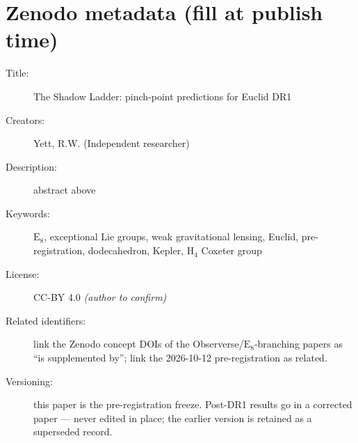 \documentclass{alienfolio}
\begin{document}
\section*{Zenodo metadata (fill at publish time)}

\begin{description}
\item[Title:] The Shadow Ladder: pinch-point predictions for Euclid DR1
\item[Creators:] Yett, R.W. (Independent researcher)
\item[Description:] abstract above
\item[Keywords:] $\mathrm{E}_8$, exceptional Lie groups, weak
gravitational lensing, Euclid, pre-registration, dodecahedron, Kepler,
$\mathrm{H}_4$ Coxeter group
\item[License:] CC-BY 4.0 \emph{(author to confirm)}
\item[Related identifiers:] link the Zenodo concept DOIs of the
Observerse/$\mathrm{E}_8$-branching papers as ``is supplemented by'';
link the 2026-10-12 pre-registration as related.
\item[Versioning:] this paper is the pre-registration freeze.
Post-DR1 results go in a corrected paper --- never edited in place; the earlier version is retained as a superseded record.
\end{description}
\end{document}
